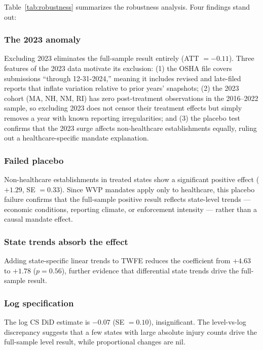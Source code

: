 \documentclass[12pt]{article}
\begin{document}


Table~\ref{tab:robustness} summarizes the robustness analysis. Four findings stand out:

\subsubsection*{The 2023 anomaly} Excluding 2023 eliminates the full-sample result entirely (ATT $= -0.11$). Three features of the 2023 data motivate its exclusion: (1) the OSHA file covers submissions ``through 12-31-2024,'' meaning it includes revised and late-filed reports that inflate variation relative to prior years' snapshots; (2) the 2023 cohort (MA, NH, NM, RI) has zero post-treatment observations in the 2016--2022 sample, so excluding 2023 does not censor their treatment effects but simply removes a year with known reporting irregularities; and (3) the placebo test confirms that the 2023 surge affects non-healthcare establishments equally, ruling out a healthcare-specific mandate explanation.

\subsubsection*{Failed placebo} Non-healthcare establishments in treated states show a significant positive effect ($+1.29$, SE $= 0.33$). Since WVP mandates apply only to healthcare, this placebo failure confirms that the full-sample positive result reflects state-level trends --- economic conditions, reporting climate, or enforcement intensity --- rather than a causal mandate effect.

\subsubsection*{State trends absorb the effect} Adding state-specific linear trends to TWFE reduces the coefficient from $+4.63$ to $+1.78$ ($p = 0.56$), further evidence that differential state trends drive the full-sample result.

\subsubsection*{Log specification} The log CS DiD estimate is $-0.07$ (SE $= 0.10$), insignificant. The level-vs-log discrepancy suggests that a few states with large absolute injury counts drive the full-sample level result, while proportional changes are nil.
\end{document}
